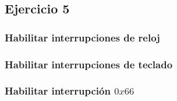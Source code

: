 \subsection{Ejercicio 5}

\subsubsection{Habilitar interrupciones de reloj}

\subsubsection{Habilitar interrupciones de teclado}

\subsubsection{Habilitar interrupción $0x66$}

